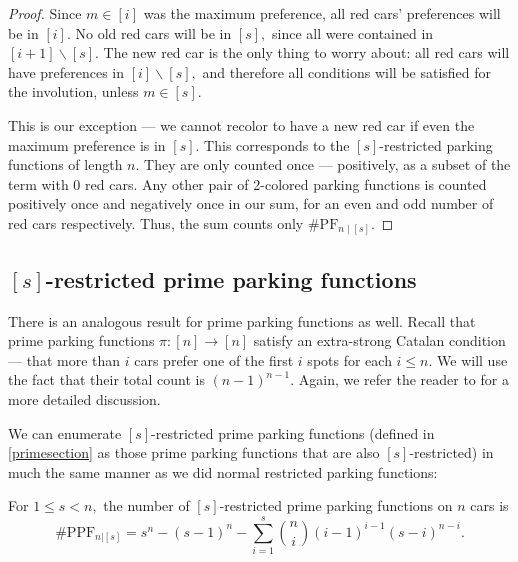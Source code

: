 \documentclass[12pt]{article}
\begin{document}
\begin{proof}
    Since $m \in [i]$ was the maximum preference, all red cars' preferences will be in $[i].$ No old red cars will be in $[s],$ since all were contained in $[i+1]\backslash [s].$ The new red car is the only thing to worry about: all red cars will have preferences in $[i]\backslash [s],$ and therefore all conditions will be satisfied for the involution, unless $m\in [s].$

	This is our exception --- we cannot recolor to have a new red car if even the maximum preference is in $[s]$. This corresponds to the $[s]$-restricted parking functions of length $n$. They are only counted once --- positively, as a subset of the term with 0 red cars. Any other pair of 2-colored parking functions is counted positively once and negatively once in our sum, for an even and odd number of red cars respectively. Thus, the sum counts only $\#\mathrm{PF}_{n \mid [s]}$.
\end{proof}

\subsection{\texorpdfstring{$[s]$-r}{R}estricted prime parking functions}

There is an analogous result for prime parking functions as well. Recall that prime parking functions $\pi:[n]\to[n]$ satisfy an extra-strong Catalan condition --- that more than $i$ cars prefer one of the first $i$ spots for each $i \le n$. We will use the fact that their total count is $(n-1)^{n-1}$. Again, we refer the reader to \cite{armon-2024} for a more detailed discussion.

We can enumerate $[s]$-restricted prime parking functions (defined in \cref{primesection} as those prime parking functions that are also $[s]$-restricted) in much the same manner as we did normal restricted parking functions:

\begin{theorem}
    \label{thm:resPPFcount1}
    For $1 \le s < n,$ the number of $[s]$-restricted prime parking functions on $n$ cars is 
    \[\#\mathrm{PPF}_{n|[s]}=s^{n} - (s - 1)^{n} - \sum_{i = 1}^{s} \binom{n}{i} (i - 1)^{i - 1} (s - i)^{n - i}.\]
\end{theorem}
\end{document}
